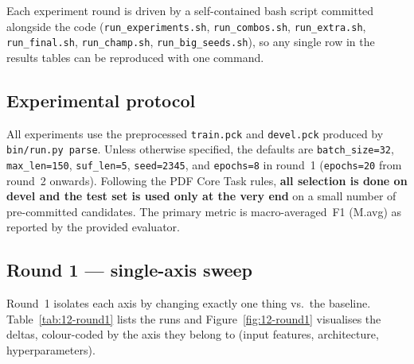 \documentclass[a4paper,12pt]{article}
\begin{document}
Each experiment round is driven by a self-contained bash script
committed alongside the code (\texttt{run\_experiments.sh},
\texttt{run\_combos.sh}, \texttt{run\_extra.sh},
\texttt{run\_final.sh}, \texttt{run\_champ.sh},
\texttt{run\_big\_seeds.sh}), so any single row in the results
tables can be reproduced with one command.

\subsection{Experimental protocol}

All experiments use the preprocessed \texttt{train.pck} and
\texttt{devel.pck} produced by \texttt{bin/run.py parse}. Unless
otherwise specified, the defaults are \texttt{batch\_size=32},
\texttt{max\_len=150}, \texttt{suf\_len=5}, \texttt{seed=2345},
and \texttt{epochs=8} in round~1 (\texttt{epochs=20} from round~2
onwards).
Following the PDF Core Task rules, \textbf{all selection is done on
devel and the test set is used only at the very end} on a small number
of pre-committed candidates. The primary metric is macro-averaged~F1
(M.avg) as reported by the provided evaluator.

\subsection{Round 1 — single-axis sweep}
\label{sec:12-round1}

Round~1 isolates each axis by changing exactly one thing vs.\ the
baseline. Table~\ref{tab:12-round1} lists the runs and
Figure~\ref{fig:12-round1} visualises the deltas, colour-coded by the
axis they belong to (input features, architecture, hyperparameters).
\end{document}
